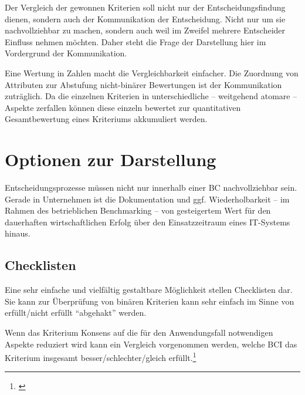 

Der Vergleich der gewonnen Kriterien soll nicht nur der Entscheidungsfindung dienen, sondern auch der Kommunikation der Entscheidung.
Nicht nur um sie nachvollziehbar zu machen, sondern auch weil im Zweifel mehrere Entscheider Einfluss nehmen möchten.
Daher steht die Frage der Darstellung hier im Vordergrund der Kommunikation.

Eine Wertung in Zahlen macht die Vergleichbarkeit einfacher.
Die Zuordnung von Attributen zur Abstufung nicht-binärer Bewertungen ist der Kommunikation zuträglich.
Da die einzelnen Kriterien in unterschiedliche -- weitgehend atomare -- Aspekte zerfallen können diese einzeln bewertet zur quantitativen Gesamtbewertung eines Kriteriums akkumuliert werden.


\section{Optionen zur Darstellung}\label{depiction}

Entscheidungsprozesse müssen nicht nur innerhalb einer \gls{BC} nachvollziehbar sein.
Gerade in Unternehmen ist die Dokumentation und ggf. Wiederholbarkeit -- \zB{} im Rahmen des betrieblichen Benchmarking -- von gesteigertem Wert für den dauerhaften wirtschaftlichen Erfolg über den Einsatzzeitraum eines IT-Systems hinaus.

\subsection{Checklisten}

Eine sehr einfache und vielfältig gestaltbare Möglichkeit stellen Checklisten dar.
Sie kann zur Überprüfung von binären Kriterien kann sehr einfach im Sinne von erfüllt/nicht erfüllt \enquote{abgehakt} werden.

Wenn das Kriterium Konsens auf die für den Anwendungsfall notwendigen Aspekte reduziert wird kann ein Vergleich vorgenommen werden, welche \gls{BCI} das Kriterium insgesamt besser/schlechter/gleich erfüllt.\footnote{\cite{TN_libero_mab215408815}}

